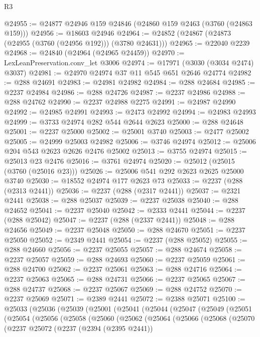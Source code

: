 \begin{lexlean}{R3}
\begin{coremodule}
@24955 := @24877 @24946 @159 @24846 (@24860 @159 @2463 (@3760 (@24863 @159)))
@24956 := @18603 @24946
@24964 := @24852 (@24867 (@24873 (@24955 (@3760 (@24956 @192))) (@3780 @24631)))
@24965 := @22040 @2239
@24968 := @24840 (@24964 (@24965 @24459))
@24970 := LexLeanPreservation.conv_let @3006
@24974 := @17971 (@3030 (@3034 @2474) @3037)
@24981 := @24970 @24974 @37 @11 @545 @651 @2646 @24774
@24982 := @288 @24691
@24983 := @24981 @24982
@24984 := @288 @24684
@24985 := @2237 @24984
@24986 := @288 @24726
@24987 := @2237 @24986
@24988 := @288 @24762
@24990 := @2237 @24988 @2275
@24991 := @24987 @24990
@24992 := @24985 @24991
@24993 := @2473 @24992
@24994 := @24983 @24993
@24999 := @3733 @24974 @282 @544 @2644 @2623
@25000 := @288 @24648
@25001 := @2237 @25000
@25002 := @25001 @3740
@25003 := @2477 @25002
@25005 := @24999 @25003 @24982
@25006 := @3746 @24974
@25012 := @25006 @204 @543 @2623 @2626 @2476 @25002
@25013 := @3755 @24974
@25015 := @25013 @23 @2476
@25016 := @3761 @24974
@25020 := @25012 (@25015 (@3760 (@25016 @23)))
@25026 := @25006 @541 @292 @2623 @2625 @25000 @3740
@25030 := @18552 @24974 @177 @2623 @73
@25033 := @2237 (@288 (@2313 @2441))
@25036 := @2237 (@288 (@2317 @2441))
@25037 := @2321 @2441
@25038 := @288 @25037
@25039 := @2237 @25038
@25040 := @288 @24652
@25041 := @2237 @25040
@25042 := @2333 @2441
@25044 := @2237 (@288 @25042)
@25047 := @2237 (@288 (@2337 @2441))
@25048 := @288 @24656
@25049 := @2237 @25048
@25050 := @288 @24670
@25051 := @2237 @25050
@25052 := @2349 @2441
@25054 := @2237 (@288 @25052)
@25055 := @288 @24660
@25056 := @2237 @25055
@25057 := @288 @24674
@25058 := @2237 @25057
@25059 := @288 @24693
@25060 := @2237 @25059
@25061 := @288 @24700
@25062 := @2237 @25061
@25063 := @288 @24716
@25064 := @2237 @25063
@25065 := @288 @24731
@25066 := @2237 @25065
@25067 := @288 @24737
@25068 := @2237 @25067
@25069 := @288 @24752
@25070 := @2237 @25069
@25071 := @2389 @2441
@25072 := @2388 @25071
@25100 := @25033
    (@25036
      (@25039
        (@25001
          (@25041
            (@25044
              (@25047
                (@25049
                  (@25051
                    (@25054
                      (@25056
                        (@25058
                          (@25060
                            (@25062
                              (@25064
                                (@25066
                                  (@25068
                                    (@25070
                                      (@2237
                                        @25072
                                        (@2237
                                          (@2394 (@2395 @2441))

\end{coremodule}
\end{lexlean}
